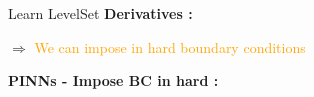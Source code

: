 \begin{frame}{Learn LevelSet }
	\textbf{Derivatives :}

	\begin{center}
	\end{center}
	
	 $\Rightarrow$ \textcolor{orange}{We can impose in hard boundary conditions}
	
	\textbf{PINNs - Impose BC in hard :}
	\begin{center}
	\end{center}
\end{frame}